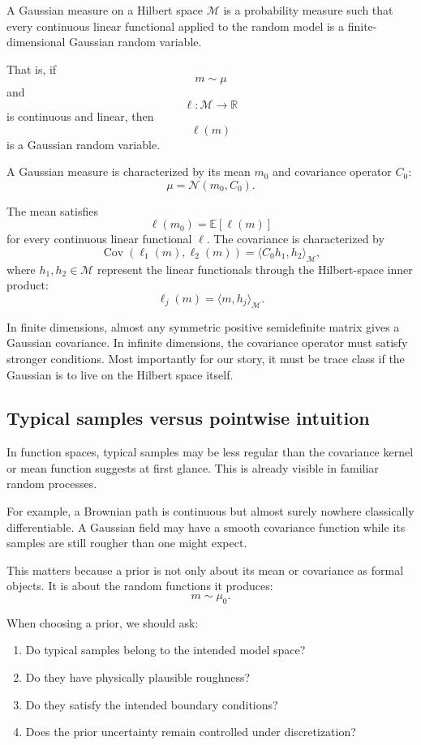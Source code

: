\documentclass[11pt,a4paper]{book}
\newcommand{\M}{\mathcal{M}}      %
\newcommand{\R}{\mathbb{R}}
\newcommand{\prior}{\mu_0}
\begin{document}
A Gaussian measure on a Hilbert space $\M$ is a probability measure such that
every continuous linear functional applied to the random model is a
finite-dimensional Gaussian random variable.

That is, if
\[
    m\sim\mu
\]
and
\[
    \ell:\M\to\R
\]
is continuous and linear, then
\[
    \ell(m)
\]
is a Gaussian random variable.

A Gaussian measure is characterized by its mean $m_0$ and covariance operator
$C_0$:
\[
    \mu = \mathcal{N}(m_0,C_0).
\]

The mean satisfies
\[
    \ell(m_0)
    =
    \mathbb{E}[\ell(m)]
\]
for every continuous linear functional $\ell$. The covariance is characterized
by
\[
    \operatorname{Cov}(\ell_1(m),\ell_2(m))
    =
    \langle C_0 h_1,h_2\rangle_{\M},
\]
where $h_1,h_2\in\M$ represent the linear functionals through the Hilbert-space
inner product:
\[
    \ell_j(m)=\langle m,h_j\rangle_{\M}.
\]

In finite dimensions, almost any symmetric positive semidefinite matrix gives a
Gaussian covariance. In infinite dimensions, the covariance operator must
satisfy stronger conditions. Most importantly for our story, it must be trace
class if the Gaussian is to live on the Hilbert space itself.

\subsection{Typical samples versus pointwise intuition}

In function spaces, typical samples may be less regular than the covariance
kernel or mean function suggests at first glance. This is already visible in
familiar random processes.

For example, a Brownian path is continuous but almost surely nowhere
classically differentiable. A Gaussian field may have a smooth covariance
function while its samples are still rougher than one might expect.

This matters because a prior is not only about its mean or covariance as formal
objects. It is about the random functions it produces:
\[
    m\sim\prior.
\]

When choosing a prior, we should ask:
\begin{enumerate}[label=\arabic*.]
    \item Do typical samples belong to the intended model space?
    \item Do they have physically plausible roughness?
    \item Do they satisfy the intended boundary conditions?
    \item Does the prior uncertainty remain controlled under discretization?
\end{enumerate}
\end{document}
